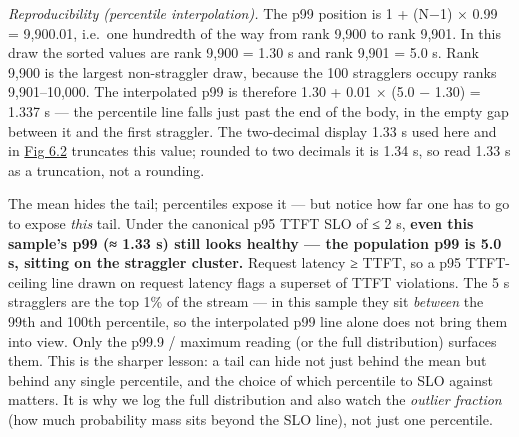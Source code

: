\emph{Reproducibility (percentile interpolation).} The p99 position is 1
+ (N−1) × 0.99 = 9,900.01, i.e.~one hundredth of the way from rank 9,900
to rank 9,901. In this draw the sorted values are rank 9,900 = 1.30 s
and rank 9,901 = 5.0 s. Rank 9,900 is the largest non-straggler draw,
because the 100 stragglers occupy ranks 9,901--10,000. The interpolated
p99 is therefore 1.30 + 0.01 × (5.0 − 1.30) = 1.337 s --- the percentile
line falls just past the end of the body, in the empty gap between it
and the first straggler. The two-decimal display 1.33 s used here and in
\hyperref[fig:6.2]{Fig 6.2} truncates this value; rounded to two decimals it is 1.34 s, so
read 1.33 s as a truncation, not a rounding.

The mean hides the tail; percentiles expose it --- but notice how far
one has to go to expose \emph{this} tail. Under the canonical p95 TTFT
SLO of ≤ 2 s, \textbf{even this sample's p99 (≈ 1.33 s) still looks
healthy --- the population p99 is 5.0 s, sitting on the straggler
cluster.} Request latency ≥ TTFT, so a p95 TTFT-ceiling line drawn on
request latency flags a superset of TTFT violations. The 5 s stragglers
are the top 1\% of the stream --- in this sample they sit \emph{between}
the 99th and 100th percentile, so the interpolated p99 line alone does
not bring them into view. Only the p99.9 / maximum reading (or the full
distribution) surfaces them. This is the sharper lesson: a tail can hide
not just behind the mean but behind any single percentile, and the
choice of which percentile to SLO against matters. It is why we log the
full distribution and also watch the \emph{outlier fraction} (how much
probability mass sits beyond the SLO line), not just one percentile.

